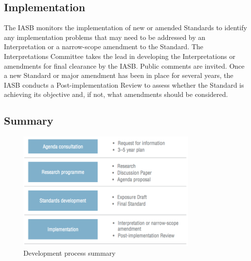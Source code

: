 \subsection{Implementation}
The IASB monitors the implementation of new or amended Standards to identify any implementation problems that may need to be addressed by an Interpretation or a narrow-scope amendment to the Standard.
The Interpretations Committee takes the lead in developing the Interpretations or amendments for  final clearance by the IASB. Public comments are invited. Once a new Standard or major amendment has been in place for several years, the IASB conducts a Post-implementation Review to assess whether the Standard is achieving its objective and, if not, what amendments should be considered.

\subsection{Summary}
\begin{figure}[h]
\caption{Development process summary}
\centering
\includegraphics[width=0.8\textwidth]{images/devprocess.png}
\end{figure}